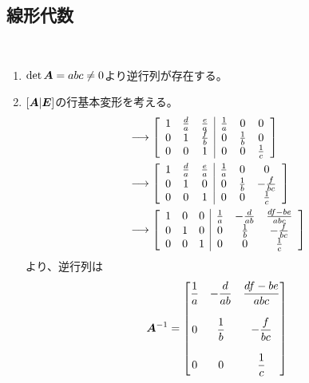 \subsection{線形代数}
\begin{ans*}
  ${}$
  \begin{enumerate}[label=(\arabic*)]
    \item $\det\bm{A} = abc\neq 0$より逆行列が存在する。
    \item $[\bm{A}|\bm{E}]$の行基本変形を考える。
    \begin{align}
      [\bA|\bE]
      &\lra \left[\begin{array}{ccc|ccc}
        1 & \frac{d}{a} & \frac{e}{a} & \frac{1}{a} & 0 & 0 \\
        0 & 1 & \frac{f}{b} & 0 & \frac{1}{b} & 0 \\
        0 & 0 & 1 & 0 & 0 & \frac{1}{c}
      \end{array}\right] \\
      &\lra \left[\begin{array}{ccc|ccc}
        1 & \frac{d}{a} & \frac{e}{a} & \frac{1}{a} & 0 & 0 \\
        0 & 1 & 0 & 0 & \frac{1}{b} & -\frac{f}{bc} \\
        0 & 0 & 1 & 0 & 0 & \frac{1}{c}
      \end{array}\right] \\
      &\lra \left[\begin{array}{ccc|ccc}
        1 & 0 & 0 & \frac{1}{a} & -\frac{d}{ab} & \frac{df - be}{abc} \\
        0 & 1 & 0 & 0 & \frac{1}{b} & -\frac{f}{bc} \\
        0 & 0 & 1 & 0 & 0 & \frac{1}{c}
      \end{array}\right]
    \end{align}
    より、逆行列は
    \begin{gather}
      \bm{A}^{-1} = \begin{bmatrix}
        \displaystyle\frac{1}{a} & \displaystyle-\frac{d}{ab} & \displaystyle\frac{df - be}{abc} \\
        \\
        \displaystyle 0 & \displaystyle\frac{1}{b} & \displaystyle-\frac{f}{bc} \\
        \\
        \displaystyle 0 & \displaystyle 0 & \displaystyle \frac{1}{c}
      \end{bmatrix}
    \end{gather}
  \end{enumerate}
\end{ans*}


